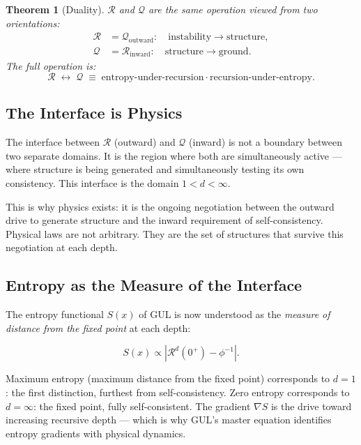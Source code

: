 \documentclass[11pt]{article}
\newtheorem{theorem}{Theorem}
\begin{document}
\begin{theorem}[Duality]
  $\mathcal{R}$ and $\mathcal{Q}$ are the same operation
  viewed from two orientations:
  \begin{align}
    \mathcal{R} &= \mathcal{Q}_{\mathrm{outward}}:
      \quad \text{instability} \to \text{structure}, \\
    \mathcal{Q} &= \mathcal{R}_{\mathrm{inward}}:
      \quad \text{structure} \to \text{ground}.
  \end{align}
  The full operation is:
  \begin{equation}
    \mathcal{R} \;\leftrightarrow\; \mathcal{Q}
    \;\equiv\;
    \text{entropy-under-recursion}
    \cdot
    \text{recursion-under-entropy.}
  \end{equation}
\end{theorem}

\subsection{The Interface is Physics}

The interface between $\mathcal{R}$ (outward) and $\mathcal{Q}$
(inward) is not a boundary between two separate domains. It is
the region where both are simultaneously active --- where structure
is being generated and simultaneously testing its own consistency.
This interface is the domain $1<d<\infty$.

This is why physics exists: it is the ongoing negotiation between
the outward drive to generate structure and the inward requirement
of self-consistency. Physical laws are not arbitrary. They are
the set of structures that survive this negotiation at each depth.

\subsection{Entropy as the Measure of the Interface}

The entropy functional $S(x)$ of GUL is now understood as the
\emph{measure of distance from the fixed point} at each depth:

\begin{equation}
  S(x) \propto \left|\mathcal{R}^d(0^+) - \phi^{-1}\right|.
\end{equation}

Maximum entropy (maximum distance from the fixed point) corresponds
to $d=1$: the first distinction, furthest from self-consistency.
Zero entropy corresponds to $d=\infty$: the fixed point, fully
self-consistent. The gradient $\nabla S$ is the drive toward
increasing recursive depth --- which is why GUL's master equation
identifies entropy gradients with physical dynamics.
\end{document}
